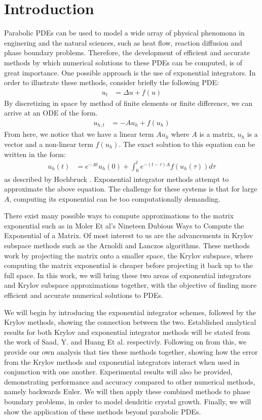 \section{Introduction}

Parabolic PDEs can be used to model a wide array of physical phenomona in enginering and the natural sciences, such as heat flow, reaction diffusion and phase boundary problems.
Therefore, the development of efficient and accurate methods by which numerical solutions to these PDEs can be computed, is of great importance.
One possible approach is the use of exponential integrators.
In order to illustrate these methods, consider briefly the following PDE:
\begin{align*}
    u_t &= \Delta u + f(u)
\end{align*}
By discretizing in space by method of finite elements or finite difference, we can arrive at an ODE of the form.
\begin{align*}
    u_{h,t} &= -Au_h + f(u_h)
\end{align*}
From here, we notice that we have a linear term $Au_h$ where $A$ is a matrix, $u_h$ is a vector and a non-linear term $f(u_h)$.
The exact solution to this equation can be written in the form:
\begin{align*}
    u_h(t) &= e^{-At}u_{h}(0) + \int^t_0 e^{-(t-\tau)A}f(u_{h}(\tau))d\tau
\end{align*}
as described by Hochbruck \cite{Hochbruck2010}.
Exponential integrator methods attempt to approximate the above equation.
The challenge for these systems is that for large $A$, computing its exponential can be too computationally demanding.

There exist many possible ways to compute approximations to the matrix exponential such as in Moler Et al's Nineteen Dubious Ways to Compute the Exponential of a Matrix\cite{Moler2003}.
Of most interest to us are the advancements in Krylov subspace methods such as the Arnoldi and Lanczos algorithms\cite{OJALVO1970}.
These methods work by projecting the matrix onto a smaller space, the Krylov subspace, where computing the matrix exponential is cheaper before projecting it back up to the full space.
In this work, we will bring these two areas of exponential integrators and Krylov subspace approximations together, with the objective of finding more efficient and accurate numerical solutions to PDEs.

We will begin by introducing the exponential integrator schemes, followed by the Krylov methods, showing the connection between the two.
Established analytical results for both Krylov and exponential integrator methods will be stated from the work of Saad, Y. \cite{Saad1992} and Huang Et al. \cite{Huang2022} respectivly.
Following on from this, we provide our own analysis that ties these methods together, showing how the error from the Krylov methods and exponential integrators interact when used in conjunction with one another.
Experimental results will also be provided, demonstrating performance and accuracy compared to other numerical methods, namely backwards Euler.
We will then apply these combined methods to phase boundary problems, in order to model dendritic crystal growth.
Finally, we will show the application of these methods beyond parabolic PDEs.